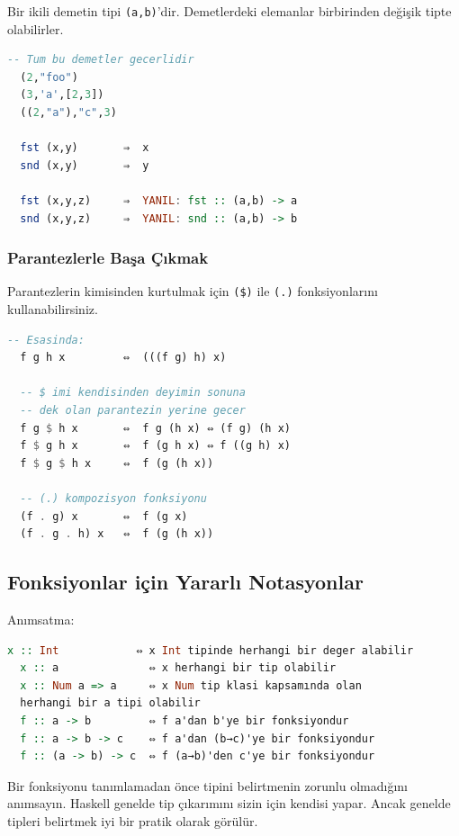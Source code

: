 \documentclass[a4paper,14pt,openany]{extbook} %
\begin{document}
Bir ikili demetin tipi \lstinline!(a,b)!'dir. Demetlerdeki elemanlar
birbirinden değişik tipte olabilirler.

\begin{lstlisting}[language=Haskell]
  -- Tum bu demetler gecerlidir
  (2,"foo")
  (3,'a',[2,3])
  ((2,"a"),"c",3)

  fst (x,y)       ⇒  x
  snd (x,y)       ⇒  y

  fst (x,y,z)     ⇒  YANIL: fst :: (a,b) -> a
  snd (x,y,z)     ⇒  YANIL: snd :: (a,b) -> b
\end{lstlisting}

\subsubsection{Parantezlerle Başa
  Çıkmak}\label{parantezlerle-baux15fa-uxe7ux131kmak}

Parantezlerin kimisinden kurtulmak için \lstinline!($)! ile \lstinline!(.)! fonksiyonlarını kullanabilirsiniz.

\begin{lstlisting}[language=Haskell]
  -- Esasinda:
  f g h x         ⇔  (((f g) h) x)

  -- $ imi kendisinden deyimin sonuna
  -- dek olan parantezin yerine gecer
  f g $ h x       ⇔  f g (h x) ⇔ (f g) (h x)
  f $ g h x       ⇔  f (g h x) ⇔ f ((g h) x)
  f $ g $ h x     ⇔  f (g (h x))

  -- (.) kompozisyon fonksiyonu
  (f . g) x       ⇔  f (g x)
  (f . g . h) x   ⇔  f (g (h x))
\end{lstlisting}

\subsection{Fonksiyonlar için Yararlı Notasyonlar}
\label{fonksiyonlar-iuxe7in-yararlux131-notasyonlar}

Anımsatma:

\begin{lstlisting}[language=Haskell]
  x :: Int            ⇔ x Int tipinde herhangi bir deger alabilir
  x :: a              ⇔ x herhangi bir tip olabilir
  x :: Num a => a     ⇔ x Num tip klasi kapsamında olan
  herhangi bir a tipi olabilir
  f :: a -> b         ⇔ f a'dan b'ye bir fonksiyondur
  f :: a -> b -> c    ⇔ f a'dan (b→c)'ye bir fonksiyondur
  f :: (a -> b) -> c  ⇔ f (a→b)'den c'ye bir fonksiyondur
\end{lstlisting}

Bir fonksiyonu tanımlamadan önce tipini belirtmenin zorunlu olmadığını anımsayın.
Haskell genelde tip çıkarımını sizin için kendisi yapar. Ancak
genelde tipleri belirtmek iyi bir pratik olarak görülür.
\end{document}
